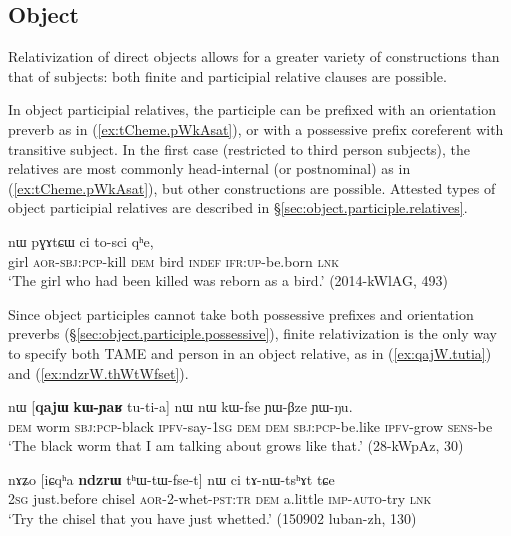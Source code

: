\subsection{Object} \label{sec:object.relativization}

Relativization of direct objects allows for a greater variety of constructions than that of subjects: both finite and participial relative clauses are possible. 

In object participial relatives, the participle can be prefixed with an orientation preverb as in (\ref{ex:tCheme.pWkAsat}), or with a possessive prefix coreferent with transitive subject. In the first case (restricted to third person subjects), the relatives are most commonly head-internal (or postnominal) as in (\ref{ex:tCheme.pWkAsat}), but other constructions are possible. Attested types of object participial relatives are described in §\ref{sec:object.participle.relatives}.

\begin{exe}
\ex \label{ex:tCheme.pWkAsat}
 nɯ pɣɤtɕɯ ci to-sci qʰe, \\
girl \textsc{aor}-\textsc{sbj}:\textsc{pcp}-kill \textsc{dem} bird \textsc{indef} \textsc{ifr}:\textsc{up}-be.born \textsc{lnk} \\
\glt `The girl who had been killed was reborn as a bird.' (2014-kWlAG, 493)
\end{exe}

Since object participles cannot take both possessive prefixes and orientation preverbs (§\ref{sec:object.participle.possessive}), finite relativization is the only way to specify both TAME and person in an object relative, as in (\ref{ex:qajW.tutia}) and (\ref{ex:ndzrW.thWtWfset}).

\begin{exe}
\ex \label{ex:qajW.tutia}
\gll  nɯ [\textbf{qajɯ} \textbf{kɯ-ɲaʁ} tu-ti-a] nɯ nɯ kɯ-fse ɲɯ-βze ɲɯ-ŋu. \\
\textsc{dem} worm \textsc{sbj}:\textsc{pcp}-black \textsc{ipfv}-say-\textsc{1sg} \textsc{dem} \textsc{dem} \textsc{sbj}:\textsc{pcp}-be.like \textsc{ipfv}-grow \textsc{sens}-be \\
\glt `The black worm that I am talking about grows like that.' (28-kWpAz, 30)
\end{exe}

\begin{exe}
\ex \label{ex:ndzrW.thWtWfset}
\gll nɤʑo [iɕqʰa \textbf{ndzrɯ} tʰɯ-tɯ-fse-t] nɯ ci tɤ-nɯ-tsʰɤt tɕe\\
\textsc{2sg} just.before chisel \textsc{aor}-2-whet-\textsc{pst}:\textsc{tr} \textsc{dem} a.little \textsc{imp}-\textsc{auto}-try \textsc{lnk}\\
\glt `Try the chisel that you have just whetted.' (150902 luban-zh, 130)
\end{exe}


